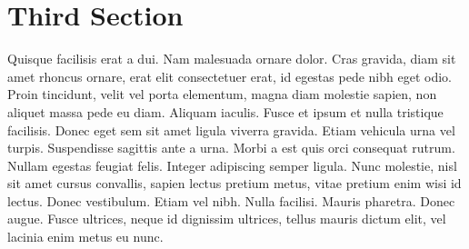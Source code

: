 \section{Third Section}
Quisque facilisis erat a dui. Nam malesuada ornare dolor. Cras gravida, diam sit amet rhoncus ornare, erat elit consectetuer erat, id egestas pede nibh eget odio. Proin tincidunt, velit vel porta elementum, magna diam molestie sapien, non aliquet massa pede eu diam. Aliquam iaculis. Fusce et ipsum et nulla tristique facilisis. Donec eget sem sit amet ligula viverra gravida. Etiam vehicula urna vel turpis. Suspendisse sagittis ante a urna. Morbi a est quis orci consequat rutrum. Nullam egestas feugiat felis. Integer adipiscing semper ligula. Nunc molestie, nisl sit amet cursus convallis, sapien lectus pretium metus, vitae pretium enim wisi id lectus. Donec vestibulum. Etiam vel nibh. Nulla facilisi. Mauris pharetra. Donec augue. Fusce ultrices, neque id dignissim ultrices, tellus mauris dictum elit, vel lacinia enim metus eu nunc.